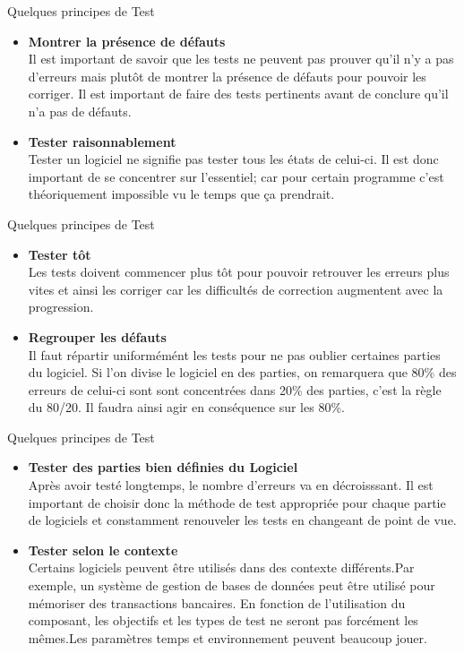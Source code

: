 \documentclass{beamer}
\begin{document}
\begin{frame}{Quelques principes de Test}
  \begin{itemize}
  
  \item{{\bfseries Montrer la présence de défauts}
 \\Il est important de savoir que les tests ne peuvent pas prouver qu'il n'y a pas d'erreurs mais plutôt de montrer la présence de défauts pour pouvoir les corriger. Il est important de faire des tests pertinents avant de conclure qu'il n'a pas de défauts.\pause}
  \item{{\bfseries Tester raisonnablement}
  \\Tester un logiciel ne signifie pas tester tous les états de celui-ci. Il est donc important de se concentrer sur l'essentiel; car pour certain programme c'est théoriquement impossible vu le temps que ça prendrait.}
  \end{itemize} 
\end{frame}
  \begin{frame}{Quelques principes de Test}
  \begin{itemize}
  \item{{\bfseries Tester tôt}
\\Les tests doivent commencer plus tôt pour pouvoir retrouver les erreurs plus vites et ainsi les corriger car les difficultés de correction augmentent avec la progression.\pause} 
  \item{{\bfseries Regrouper les défauts}
 \\ Il faut répartir uniformémént les tests pour ne pas oublier certaines parties du logiciel. Si l'on divise le logiciel en des parties, on remarquera que 80\% des erreurs de celui-ci sont sont concentrées dans 20\% des parties, c'est la règle du 80/20. Il faudra ainsi agir en conséquence sur les 80\%. }
 \end{itemize} 
\end{frame}
 \begin{frame}{Quelques principes de Test}
  \begin{itemize}
  \item{{\bfseries Tester des parties bien définies du Logiciel}
 \\Après avoir testé longtemps, le nombre d'erreurs va en décroisssant. Il est important de choisir donc la méthode de test appropriée pour chaque partie de logiciels et constamment renouveler les tests en changeant de point de vue. \pause}

  \item{{\bfseries Tester selon le contexte}
  \\Certains logiciels peuvent être utilisés dans des contexte différents.Par exemple, un système de gestion de bases de données peut être utilisé pour mémoriser des transactions bancaires. En fonction de l'utilisation du composant, les objectifs et les types de test ne seront pas forcément les mêmes.Les paramètres temps et environnement peuvent beaucoup jouer. }
  \end{itemize} 
  
\end{frame}
\end{document}
